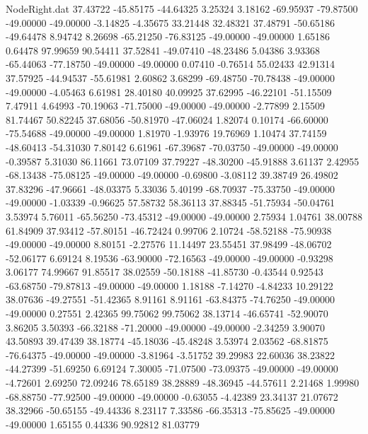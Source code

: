 \begin{filecontents}{NodeRight.dat}
  37.43722  -45.85175  -44.64325     3.25324    3.18162  -69.95937  -79.87500  -49.00000  -49.00000   -3.14825   -4.35675   33.21448   32.48321
  37.48791  -50.65186  -49.64478     8.94742    8.26698  -65.21250  -76.83125  -49.00000  -49.00000    1.65186    0.64478   97.99659   90.54411
  37.52841  -49.07410  -48.23486     5.04386    3.93368  -65.44063  -77.18750  -49.00000  -49.00000    0.07410   -0.76514   55.02433   42.91314
  37.57925  -44.94537  -55.61981     2.60862    3.68299  -69.48750  -70.78438  -49.00000  -49.00000   -4.05463    6.61981   28.40180   40.09925
  37.62995  -46.22101  -51.15509     7.47911    4.64993  -70.19063  -71.75000  -49.00000  -49.00000   -2.77899    2.15509   81.74467   50.82245
  37.68056  -50.81970  -47.06024     1.82074    0.10174  -66.60000  -75.54688  -49.00000  -49.00000    1.81970   -1.93976   19.76969    1.10474
  37.74159  -48.60413  -54.31030     7.80142    6.61961  -67.39687  -70.03750  -49.00000  -49.00000   -0.39587    5.31030   86.11661   73.07109
  37.79227  -48.30200  -45.91888     3.61137    2.42955  -68.13438  -75.08125  -49.00000  -49.00000   -0.69800   -3.08112   39.38749   26.49802
  37.83296  -47.96661  -48.03375     5.33036    5.40199  -68.70937  -75.33750  -49.00000  -49.00000   -1.03339   -0.96625   57.58732   58.36113
  37.88345  -51.75934  -50.04761     3.53974    5.76011  -65.56250  -73.45312  -49.00000  -49.00000    2.75934    1.04761   38.00788   61.84909
  37.93412  -57.80151  -46.72424     0.99706    2.10724  -58.52188  -75.90938  -49.00000  -49.00000    8.80151   -2.27576   11.14497   23.55451
  37.98499  -48.06702  -52.06177     6.69124    8.19536  -63.90000  -72.16563  -49.00000  -49.00000   -0.93298    3.06177   74.99667   91.85517
  38.02559  -50.18188  -41.85730    -0.43544    0.92543  -63.68750  -79.87813  -49.00000  -49.00000    1.18188   -7.14270   -4.84233   10.29122
  38.07636  -49.27551  -51.42365     8.91161    8.91161  -63.84375  -74.76250  -49.00000  -49.00000    0.27551    2.42365   99.75062   99.75062
  38.13714  -46.65741  -52.90070     3.86205    3.50393  -66.32188  -71.20000  -49.00000  -49.00000   -2.34259    3.90070   43.50893   39.47439
  38.18774  -45.18036  -45.48248     3.53974    2.03562  -68.81875  -76.64375  -49.00000  -49.00000   -3.81964   -3.51752   39.29983   22.60036
  38.23822  -44.27399  -51.69250     6.69124    7.30005  -71.07500  -73.09375  -49.00000  -49.00000   -4.72601    2.69250   72.09246   78.65189
  38.28889  -48.36945  -44.57611     2.21468    1.99980  -68.88750  -77.92500  -49.00000  -49.00000   -0.63055   -4.42389   23.34137   21.07672
  38.32966  -50.65155  -49.44336     8.23117    7.33586  -66.35313  -75.85625  -49.00000  -49.00000    1.65155    0.44336   90.92812   81.03779

\end{filecontents}

